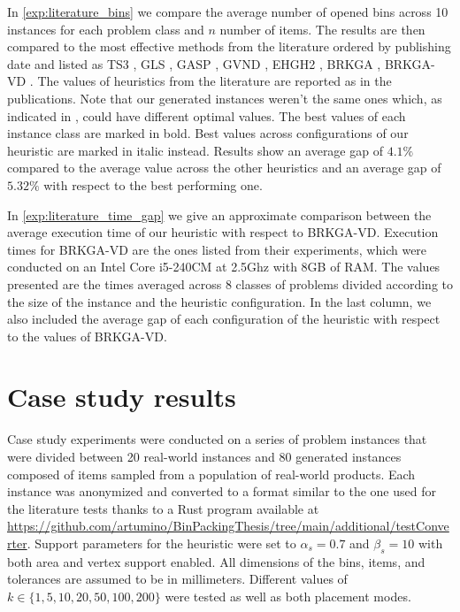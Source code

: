 In \cref{exp:literature_bins} we compare the average number of opened bins across 10 instances for each problem class and $n$ number of items.
The results are then compared to the most effective methods from the literature ordered by publishing date and listed as TS3 \citep{lodi2002heuristic}, GLS \citep{faroe2003guided}, GASP \citep{crainic2009ts2pack}, GVND \citep{parreno2010hybrid}, EHGH2 \citep{hifi2014hybrid}, BRKGA \citep{gonccalves2013biased}, BRKGA-VD \citep{zudio2018brkga}.
The values of heuristics from the literature are reported as in the publications. Note that our generated instances weren't the same ones which, as indicated in \cite{hifi2014hybrid}, could have different optimal values.
The best values of each instance class are marked in bold. Best values across configurations of our heuristic are marked in italic instead.
Results show an average gap of $4.1\%$ compared to the average value across the other heuristics and an average gap of $5.32\%$ with respect to the best performing one.

In \cref{exp:literature_time_gap} we give an approximate comparison between the average execution time of our heuristic with respect to BRKGA-VD.
Execution times for BRKGA-VD are the ones listed from their experiments, which were conducted on an Intel Core i5-240CM at 2.5Ghz with 8GB of RAM.
The values presented are the times averaged across 8 classes of problems divided according to the size of the instance and the heuristic configuration.
In the last column, we also included the average gap of each configuration of the heuristic with respect to the values of BRKGA-VD.
\label{exp:literature_tests}



\clearpage
\section{Case study results}
Case study experiments were conducted on a series of problem instances that were divided between 20 real-world instances and 80 generated instances composed of items sampled from a population of real-world products.
Each instance was anonymized and converted to a format similar to the one used for the literature tests thanks to a Rust program available at \url{https://github.com/artumino/BinPackingThesis/tree/main/additional/testConverter}.
Support parameters for the heuristic were set to $\alpha_s = 0.7$ and $\beta_s = 10$ with both area and vertex support enabled. All dimensions of the bins, items, and tolerances are assumed to be in millimeters.
Different values of $k \in \{1, 5, 10, 20, 50, 100, 200\}$ were tested as well as both placement modes.


